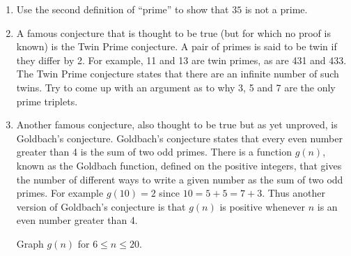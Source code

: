 \documentclass[10pt,]{book}
\theoremstyle{plain}
\theoremstyle{definition}
\theoremstyle{definition}
\numberwithin{equation}{section}
\newcommand{\hint}[1]{ }
\begin{document}
\begin{enumerate}[label=(\alph*)]
        \hint{Well, we know that 6 really isn't a prime... Maybe its factors enter into this somehow\dots{}}
\item\hypertarget{li-32}{}
        Use the second definition of ``prime'' to show that \(35\) is
        not a prime.



        \hint{How about \(a=2\cdot5\) and \(b=3\cdot7\).  Now you come up with a different pair!}
\item\hypertarget{li-33}{}
        A famous conjecture that is thought to be true (but
        for which no proof is known) is the  
        Twin Prime conjecture.
        A pair of primes is said to be twin if they differ by 2.
        For example, 11 and 13 are twin primes, as are 431 and 433.
        The Twin Prime conjecture states that there are an infinite
        number of such twins.  Try to come up with an argument as
        to why 3, 5 and 7 are the only prime triplets.



        \hint{It has to do with one of the numbers being divisible by 3. (Why is this forced to be the case?) If that number isn't actually 3, then you know it's composite.}
\item\hypertarget{li-34}{}
        Another famous conjecture, also thought to be true \textemdash{} but
        as yet unproved, is 
        Goldbach's conjecture.  Goldbach's conjecture
        states that every even number greater than 4 is the sum of two odd
        primes.  There is a function \(g(n)\), known as the Goldbach function, defined
        on the positive integers, that gives the number of different ways to 
        write a given number as the sum of two odd primes.  For example \(g(10) = 2\)
        since \(10=5+5=7+3\).  Thus another version of Goldbach's conjecture
        is that \(g(n)\) is positive whenever \(n\) is an even number greater than
        4.

        Graph \(g(n)\) for \(6 \leq n \leq 20\).



        \hint{If you don't like making graphs, a table of the values of g(n) would suffice. Note that we don't count sums twice that only differ by order. For example, 16 = 13+3 and 11+5 (and 5+11 and 3+13) but g(16)=2.}
\end{enumerate}
\typeout{************************************************}
\typeout{************************************************}
\end{document}
